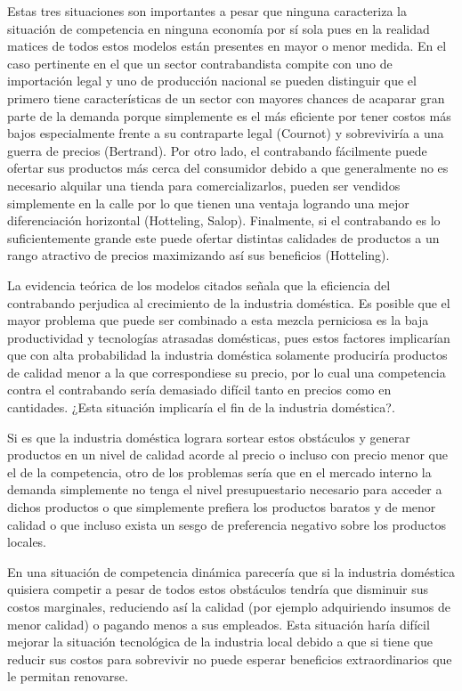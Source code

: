 \documentclass[12pt,letterpaper]{article}
\begin{document}
Estas tres situaciones son importantes a pesar que ninguna caracteriza la situación de competencia en ninguna economía por sí sola pues en la realidad matices de todos estos modelos están presentes en mayor o menor medida. En el caso pertinente en el que un sector contrabandista compite con uno de importación legal y uno de producción nacional se pueden distinguir que el primero tiene características de un sector con mayores chances de acaparar gran parte de la demanda porque simplemente es el más eficiente por tener costos más bajos especialmente frente a su contraparte legal (Cournot) y sobreviviría a una guerra de precios (Bertrand). Por otro lado, el contrabando fácilmente puede ofertar sus productos más cerca del consumidor debido a que generalmente no es necesario alquilar una tienda para comercializarlos, pueden ser vendidos simplemente en la calle por lo que tienen una ventaja logrando una mejor diferenciación horizontal (Hotteling, Salop). Finalmente, si el contrabando es lo suficientemente grande este puede ofertar distintas calidades de productos a un rango atractivo de precios maximizando así sus beneficios (Hotteling).

La evidencia teórica de los modelos citados señala que la eficiencia del contrabando perjudica al crecimiento de la industria doméstica. Es posible que el mayor problema que puede ser combinado a esta mezcla perniciosa es la baja productividad y tecnologías atrasadas domésticas, pues estos factores implicarían que con alta probabilidad la industria doméstica solamente produciría productos de calidad menor a la que correspondiese su precio, por lo cual una competencia contra el contrabando sería demasiado difícil tanto en precios como en cantidades. ¿Esta situación implicaría el fin de la industria doméstica?. 

Si es que la industria doméstica lograra sortear estos obstáculos y generar productos en un nivel de calidad acorde al precio o incluso con precio menor que el de la competencia, otro de los problemas sería que en el mercado interno la demanda simplemente no tenga el nivel presupuestario necesario para acceder a dichos productos o que simplemente prefiera los productos baratos y de menor calidad o que incluso exista un sesgo de preferencia negativo sobre los productos locales.

En una situación de competencia dinámica parecería que si la industria doméstica quisiera competir a pesar de todos estos obstáculos tendría que disminuir sus costos marginales, reduciendo así la calidad (por ejemplo adquiriendo insumos de menor calidad) o pagando menos a sus empleados. Esta situación haría difícil mejorar la situación tecnológica de la industria local debido a que si tiene que reducir sus costos para sobrevivir no puede esperar beneficios extraordinarios que le permitan renovarse.
\end{document}
